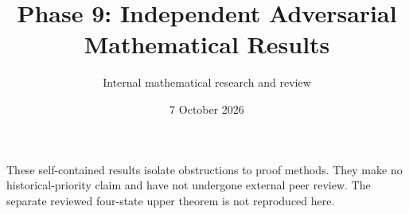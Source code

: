 \documentclass[11pt]{article}
\title{Phase 9: Independent Adversarial Mathematical Results}
\author{Internal mathematical research and review}
\date{7 October 2026}
\begin{document}
\maketitle
\noindent These self-contained results isolate obstructions to proof methods.
They make no historical-priority claim and have not undergone external peer
review. The separate reviewed four-state upper theorem is not reproduced here.


\end{document}
